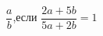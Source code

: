 \begin{ex}[type=calculate_expression]
	\begin{condition}
		\( \dfrac{a}{b} \),\quad если \( \dfrac{2a+5b}{5a+2b}=1 \)
	\end{condition}
\end{ex}